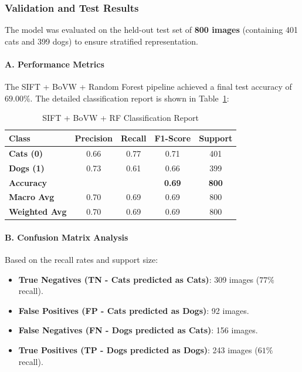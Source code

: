 \documentclass[12pt,a4paper]{article}
\begin{document}
\subsubsection{Validation and Test Results}
The model was evaluated on the held-out test set of \textbf{800 images} (containing 401 cats and 399 dogs) to ensure stratified representation.

\paragraph{A. Performance Metrics}
The SIFT + BoVW + Random Forest pipeline achieved a final test accuracy of \textbf{$69.00\%$}. The detailed classification report is shown in Table~\ref{tab:sift_class_report}:

\begin{table}[H]
\centering
\caption{SIFT + BoVW + RF Classification Report}
\label{tab:sift_class_report}
\begin{tabular}{lcccc}
\toprule
Class & Precision & Recall & F1-Score & Support \\
\midrule
\textbf{Cats (0)} & 0.66 & 0.77 & 0.71 & 401 \\
\textbf{Dogs (1)} & 0.73 & 0.61 & 0.66 & 399 \\
\midrule
\textbf{Accuracy} & & & \textbf{0.69} & \textbf{800} \\
\textbf{Macro Avg} & 0.70 & 0.69 & 0.69 & 800 \\
\textbf{Weighted Avg} & 0.70 & 0.69 & 0.69 & 800 \\
\bottomrule
\end{tabular}
\end{table}

\paragraph{B. Confusion Matrix Analysis}
Based on the recall rates and support size:
\begin{itemize}
    \item \textbf{True Negatives (TN - Cats predicted as Cats)}: 309 images ($77\%$ recall).
    \item \textbf{False Positives (FP - Cats predicted as Dogs)}: 92 images.
    \item \textbf{False Negatives (FN - Dogs predicted as Cats)}: 156 images.
    \item \textbf{True Positives (TP - Dogs predicted as Dogs)}: 243 images ($61\%$ recall).
\end{itemize}
\end{document}
